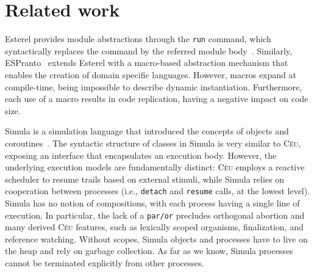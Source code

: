 \documentclass{acm_proc_article-sp}
\newcommand{\CEU}{\textsc{C\'{e}u}\xspace}
\newcommand{\code}[1] {{\small{\texttt{#1}}}}
\newcommand{\1}{\;}
\newcommand{\2}{\;\;}
\newcommand{\3}{\;\;\;}
\newcommand{\5}{\;\;\;\;\;}
\begin{document}

\section{Related work}
\label{sec.related}


Esterel provides module abstractions through the \code{run} command, which 
syntactically replaces the command by the referred module 
body~\cite{esterel.primer}.
%
Similarly, ESPranto~\cite{espranto} extends Esterel with a macro-based 
abstraction mechanism that enables the creation of domain specific languages.
%
However, macros expand at compile-time, being impossible to describe dynamic 
instantiation.
Furthermore, each use of a macro results in code replication, having a negative 
impact on code size.

Simula is a simulation language that introduced the concepts of objects and 
coroutines~\cite{simula}.
%
The syntactic structure of classes in Simula is very similar to \CEU, exposing 
an interface that encapsulates an execution body.
%
However, the underlying execution models are fundamentally distinct:
\CEU employs a reactive scheduler to resume trails based on external stimuli, 
while Simula relies on cooperation between processes (i.e., \code{detach} and 
\code{resume} calls, at the lowest level).
%
Simula has no notion of compositions, with each process having a single line of 
execution.
In particular, the lack of a \code{par/or} precludes orthogonal abortion and 
many derived \CEU features, such as lexically scoped organisms, finalization, 
and reference watching.
%
Without scopes, Simula objects and processes have to live on the heap and rely 
on garbage collection.
As far as we know, Simula processes cannot be terminated explicitly from other 
processes.
%
\end{document}
